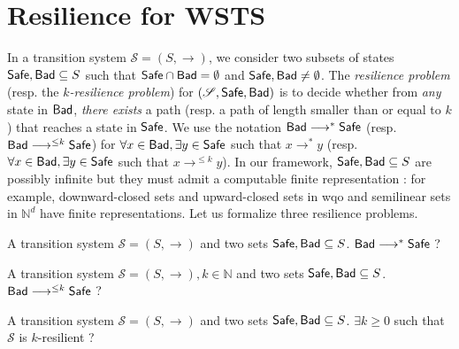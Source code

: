 
\section{Resilience for WSTS}

In a transition system $\mathscr{S}=(S,\rightarrow)$, we consider two subsets of states $\textsf{Safe}, \textsf{Bad} \subseteq S$ such that $\textsf{Safe} \cap  \textsf{Bad} = \emptyset$ and $\textsf{Safe} ,  \textsf{Bad} \neq \emptyset$.
The \emph{resilience problem} (resp. the \emph{$k$-resilience problem}) for $(\mathscr{S},\textsf{Safe},\textsf{Bad})$ is to decide whether from \emph{any} state in $\textsf{Bad}$, \emph{there exists} a path (resp. a path of length smaller than or equal to $k$) that reaches a state in $\textsf{Safe}$. We use the notation $\textsf{Bad} \longrightarrow^{*} \textsf{Safe}$ (resp. $\textsf{Bad} \longrightarrow^{\leq k} \textsf{Safe}$) for $\forall x \in \textsf{Bad}, \exists y \in \textsf{Safe}$ such that $x \longrightarrow^{*} y$ (resp.  $\forall x \in \textsf{Bad}, \exists y \in \textsf{Safe}$ such that $x \longrightarrow^{\leq k} y$). In our framework, $\textsf{Safe}, \textsf{Bad} \subseteq S$  are possibly infinite but they must admit a computable finite representation : for example, downward-closed sets and upward-closed sets in wqo and semilinear sets in $\mathbb{N}^d$ have finite representations. 
Let us formalize three resilience problems.

{A transition system $\mathscr{S}=(S,\rightarrow)$ and two sets $\textsf{Safe}, \textsf{Bad} \subseteq S$.}
{$\textsf{Bad} \longrightarrow^{*} \textsf{Safe}$ ?\newline}
%

%

{A transition system $\mathscr{S}=(S,\rightarrow), k \in \mathbb{N}$ and two sets $\textsf{Safe}, \textsf{Bad} \subseteq S$.}
{$\textsf{Bad} \longrightarrow^{\leq k} \textsf{Safe}$ ?\newline}

{A transition system $\mathscr{S}=(S,\rightarrow)$ and two sets $\textsf{Safe}, \textsf{Bad} \subseteq S$.}
{$\exists k \geq 0$ such that $\mathscr{S}$ is %
 $k$-resilient ?\newline}



